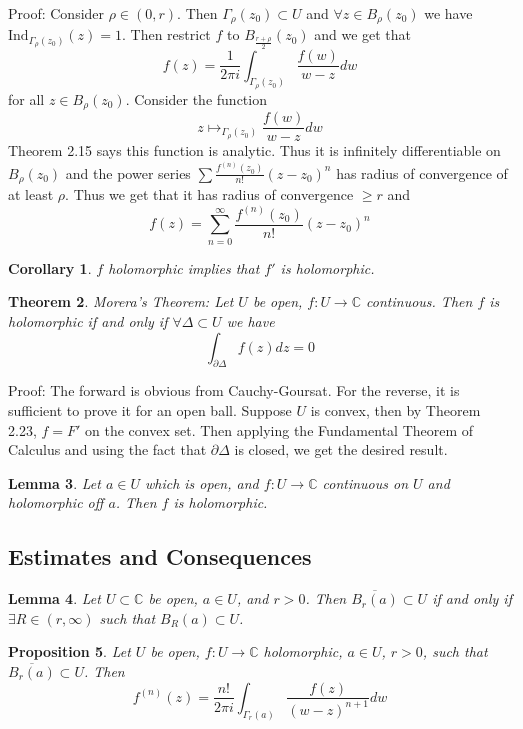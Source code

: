 \documentclass[11pt]{article}
\theoremstyle{plain}
\newtheorem{theorem}{Theorem}[section]
\newtheorem{corollary}[theorem]{Corollary}
\newtheorem{lemma}[theorem]{Lemma}
\newtheorem{proposition}[theorem]{Proposition}
\theoremstyle{definition}
\newcommand{\C}{\mathbb{C}}
\newcommand{\Ind}{\text{Ind}}
\begin{document}
Proof: Consider $\rho \in (0, r)$. Then $\Gamma_{\rho}(z_0) \subset U$ and $\forall z \in B_{\rho}(z_0)$ we have $\Ind_{\Gamma_{\rho}(z_0)}(z) = 1$. Then restrict $f$ to $B_{\frac{r + \rho}{2}}(z_0)$ and we get that 
$$ f(z) = \frac{1}{2\pi i} \int_{\Gamma_{\rho}(z_0)} \frac{f(w)}{w - z} dw $$
for all $z \in B_{\rho}(z_0)$. Consider the function 
$$ z \mapsto_{\Gamma_{\rho}(z_0)} \frac{f(w)}{w-z} dw $$
Theorem 2.15  says this function is analytic. Thus it is infinitely differentiable on $B_{\rho}(z_0)$ and the power series $\sum \frac{f^{(n)}(z_0)}{n!} (z - z_0)^n$ has radius of convergence of at least $\rho$. Thus we get that it has radius of convergence $\geq r$ and 
$$ f(z) = \sum_{n=0}^{\infty} \frac{f^{(n)}(z_0)}{n!} (z - z_0)^n $$

\begin{corollary} 
$f$ holomorphic implies that $f'$ is holomorphic.
\end{corollary}

\begin{theorem}
Morera's Theorem: Let $U$ be open, $f:U\to\C$ continuous. Then $f$ is holomorphic if and only if $\forall \Delta \subset U$ we have 
$$ \int_{\partial\Delta}f(z)dz = 0 $$
\end{theorem}

Proof: The forward is obvious from Cauchy-Goursat. For the reverse, it is sufficient to prove it for an open ball. Suppose $U$ is convex, then by Theorem 2.23, $f = F'$ on the convex set. Then applying the Fundamental Theorem of Calculus and using the fact that $\partial\Delta$ is closed, we get the desired result.

\begin{lemma}
Let $a\in U$ which is open, and $f: U \to \mathbb{C}$ continuous on $U$ and holomorphic off $a$. Then $f$ is holomorphic.  
\end{lemma}

\subsection{Estimates and Consequences}
\begin{lemma}
Let $U \subset \C$ be open, $a \in U$, and $r > 0$. Then $\overline{B_r(a)} \subset U$ if and only if $\exists R \in (r, \infty)$ such that $B_R(a) \subset U$.
\end{lemma}

\begin{proposition}
Let $U$ be open, $f: U \to \C$ holomorphic, $a \in U$, $r > 0$, such that $\overline{B_r(a)} \subset U$. Then 
$$ f^{(n)}(z) = \frac{n!}{2\pi i} \int_{\Gamma_r(a)} \frac{f(z)}{(w-z)^{n+1}} dw $$
\end{proposition}
\end{document}
